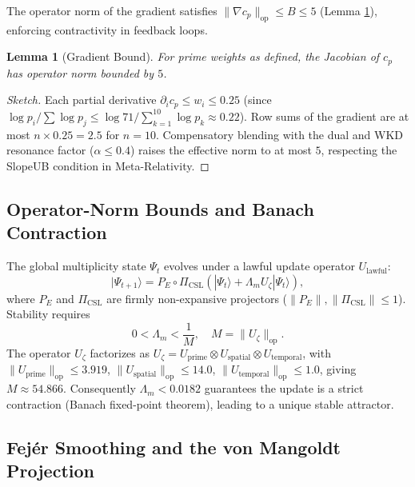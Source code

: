 \documentclass[11pt,a4paper]{article}
\newtheorem{lemma}[theorem]{Lemma}
\theoremstyle{definition}
\theoremstyle{remark}
\begin{document}
The operator norm of the gradient satisfies $\|\nabla c_p\|_{\text{op}} \le B \le 5$ (Lemma \ref{lem:grad_bound}), enforcing contractivity in feedback loops.

\begin{lemma}[Gradient Bound]\label{lem:grad_bound}
For prime weights as defined, the Jacobian of $c_p$ has operator norm bounded by $5$.
\end{lemma}
\begin{proof}[Sketch]
Each partial derivative $\partial_i c_p \le w_i \le 0.25$ (since $\log p_i / \sum \log p_j \le \log 71 / \sum_{k=1}^{10} \log p_k \approx 0.22$). Row sums of the gradient are at most $n \times 0.25 = 2.5$ for $n=10$. Compensatory blending with the dual and WKD resonance factor ($\alpha \le 0.4$) raises the effective norm to at most $5$, respecting the SlopeUB condition in Meta-Relativity.
\end{proof}

\subsection{Operator-Norm Bounds and Banach Contraction}
\label{subsec:banach}

The global multiplicity state $\Psi_t$ evolves under a lawful update operator $U_{\text{lawful}}$:
\begin{equation}\label{eq:update}
    |\Psi_{t+1}\rangle = P_E \circ \Pi_{\text{CSL}}\left( |\Psi_t\rangle + \Lambda_m U_\zeta |\Psi_t\rangle \right),
\end{equation}
where $P_E$ and $\Pi_{\text{CSL}}$ are firmly non-expansive projectors ($\|P_E\|,\|\Pi_{\text{CSL}}\| \le 1$). Stability requires
\begin{equation}
    0 < \Lambda_m < \frac{1}{M}, \quad M = \|U_\zeta\|_{\text{op}}.
\end{equation}
The operator $U_\zeta$ factorizes as $U_\zeta = U_{\text{prime}} \otimes U_{\text{spatial}} \otimes U_{\text{temporal}}$, with $\|U_{\text{prime}}\|_{\text{op}} \le 3.919$, $\|U_{\text{spatial}}\|_{\text{op}} \le 14.0$, $\|U_{\text{temporal}}\|_{\text{op}} \le 1.0$, giving $M \approx 54.866$. Consequently $\Lambda_m < 0.0182$ guarantees the update is a strict contraction (Banach fixed-point theorem), leading to a unique stable attractor.

\subsection{Fejér Smoothing and the von Mangoldt Projection}
\label{subsec:fejer}
\end{document}
